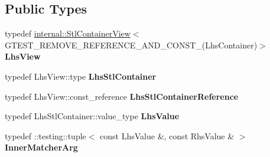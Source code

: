 \subsection*{Public Types}
\begin{DoxyCompactItemize}
\item 
typedef \hyperlink{classtesting_1_1internal_1_1StlContainerView}{internal\+::\+Stl\+Container\+View}$<$ G\+T\+E\+S\+T\+\_\+\+R\+E\+M\+O\+V\+E\+\_\+\+R\+E\+F\+E\+R\+E\+N\+C\+E\+\_\+\+A\+N\+D\+\_\+\+C\+O\+N\+S\+T\+\_\+(Lhs\+Container)$>$ {\bfseries Lhs\+View}\hypertarget{classtesting_1_1internal_1_1PointwiseMatcher_1_1Impl_a5240abc710bb0a5bedfd180bf6701fae}{}\label{classtesting_1_1internal_1_1PointwiseMatcher_1_1Impl_a5240abc710bb0a5bedfd180bf6701fae}

\item 
typedef Lhs\+View\+::type {\bfseries Lhs\+Stl\+Container}\hypertarget{classtesting_1_1internal_1_1PointwiseMatcher_1_1Impl_a23420b57b4cd6d83cec8afda746c27f2}{}\label{classtesting_1_1internal_1_1PointwiseMatcher_1_1Impl_a23420b57b4cd6d83cec8afda746c27f2}

\item 
typedef Lhs\+View\+::const\+\_\+reference {\bfseries Lhs\+Stl\+Container\+Reference}\hypertarget{classtesting_1_1internal_1_1PointwiseMatcher_1_1Impl_a9df3eb0866f76d59dbdd35fafeb5590c}{}\label{classtesting_1_1internal_1_1PointwiseMatcher_1_1Impl_a9df3eb0866f76d59dbdd35fafeb5590c}

\item 
typedef Lhs\+Stl\+Container\+::value\+\_\+type {\bfseries Lhs\+Value}\hypertarget{classtesting_1_1internal_1_1PointwiseMatcher_1_1Impl_a453769e721f4212e399f76c980b4b65c}{}\label{classtesting_1_1internal_1_1PointwiseMatcher_1_1Impl_a453769e721f4212e399f76c980b4b65c}

\item 
typedef \+::testing\+::tuple$<$ const Lhs\+Value \&, const Rhs\+Value \& $>$ {\bfseries Inner\+Matcher\+Arg}\hypertarget{classtesting_1_1internal_1_1PointwiseMatcher_1_1Impl_aba9d983881cbfbb37724b8b40e863898}{}\label{classtesting_1_1internal_1_1PointwiseMatcher_1_1Impl_aba9d983881cbfbb37724b8b40e863898}

\end{DoxyCompactItemize}
